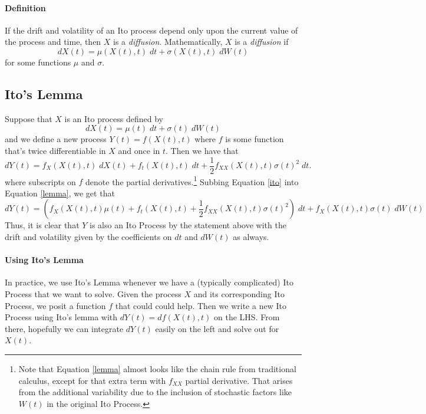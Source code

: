 \documentclass[12pt]{article}
\theoremstyle{plain}
\theoremstyle{definition}
\theoremstyle{remark}
\begin{document}
\paragraph{Definition} If the drift and volatility of an Ito process
depend only upon the current value of the process and time, then
$X$ is a \emph{diffusion}.  Mathematically, $X$ is a \emph{diffusion}
if
   \[ dX(t) = \mu(X(t),t)\; dt+ \sigma(X(t),t)\; dW(t) \]
for some functions $\mu$ and $\sigma$.

\subsection{Ito's Lemma}

Suppose that $X$ is an Ito process defined by
\begin{equation}
   \label{ito}
   dX(t) = \mu(t) \; dt + \sigma(t) \; dW(t)
\end{equation}
and we define a new process $Y(t) = f(X(t),t)$ where $f$ is some
function that's twice differentiable in $X$ and once in $t$.  Then
we have that
\begin{equation}
   \label{lemma}
   dY(t) = f_X(X(t),t) \; dX(t) + f_t(X(t),t) \; dt + \frac{1}{2}
   f_{XX}(X(t),t)\sigma(t)^2 \; dt.
\end{equation}
where subscripts on $f$ denote the partial derivatives.\footnote{Note
that Equation \ref{lemma} almost looks like the chain rule from
traditional calculus, except for that extra term with $f_{XX}$ partial
derivative. That arises from the additional variability due to the
inclusion of stochastic factors like $W(t)$ in the original Ito
Process.} Subbing Equation \ref{ito} into Equation \ref{lemma},
we get that
   \[ dY(t) =\left(f_X(X(t),t)\mu(t) + f_t(X(t),t)  + \frac{1}{2}
      f_{XX}(X(t),t)\sigma(t)^2 \right) \; dt +
      f_X(X(t),t)\sigma(t) \; dW(t)
   \]
Thus, it is clear that $Y$ is also an Ito Process by the statement
above with the drift and volatility given by the coefficients on
$dt$ and $dW(t)$ as always.

\paragraph{Using Ito's Lemma} In practice, we use Ito's Lemma
whenever we have a (typically complicated) Ito Process that we want
to solve.  Given the process $X$ and its corresponding Ito Process,
we posit a function $f$ that could could help. Then we write a
new Ito Process using Ito's lemma with $dY(t) = df(X(t),t)$ on the LHS.
From there, hopefully we can integrate $dY(t)$ easily on the left and
solve out for $X(t)$.
\end{document}
